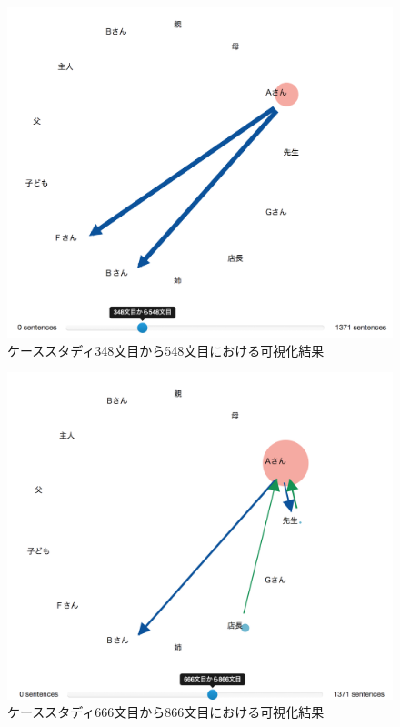 \documentclass[shuuron]{kuee}
\begin{document}
\begin{figure}
  \begin{center}
    \includegraphics[width=\linewidth]{caseFirst.png}
  \end{center}
  \caption{ケーススタディ348文目から548文目における可視化結果}
  \label{fig:caseFirst}
\end{figure}

\begin{figure}
  \begin{center}
    \includegraphics[width=\linewidth]{caseSecond.png}
  \end{center}
  \caption{ケーススタディ666文目から866文目における可視化結果}
  \label{fig:caseSecond}
\end{figure}
\end{document}
